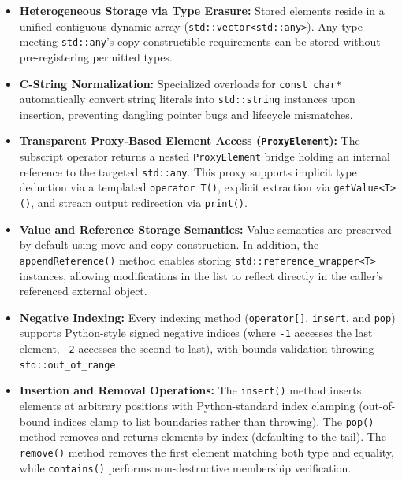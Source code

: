 \documentclass[12pt,a4paper]{report}
\begin{document}
\begin{itemize}
    \item \textbf{Heterogeneous Storage via Type Erasure:} Stored elements reside in a unified contiguous dynamic array (\texttt{std::vector<std::any>}). Any type meeting \texttt{std::any}'s copy-constructible requirements can be stored without pre-registering permitted types.
    
    \item \textbf{C-String Normalization:} Specialized overloads for \texttt{const char*} automatically convert string literals into \texttt{std::string} instances upon insertion, preventing dangling pointer bugs and lifecycle mismatches.
    
    \item \textbf{Transparent Proxy-Based Element Access (\texttt{ProxyElement}):} The subscript operator returns a nested \texttt{ProxyElement} bridge holding an internal reference to the targeted \texttt{std::any}. This proxy supports implicit type deduction via a templated \texttt{operator T()}, explicit extraction via \texttt{getValue<T>()}, and stream output redirection via \texttt{print()}.
    
    \item \textbf{Value and Reference Storage Semantics:} Value semantics are preserved by default using move and copy construction. In addition, the \texttt{appendReference()} method enables storing \texttt{std::reference\_wrapper<T>} instances, allowing modifications in the list to reflect directly in the caller's referenced external object.
    
    \item \textbf{Negative Indexing:} Every indexing method (\texttt{operator[]}, \texttt{insert}, and \texttt{pop}) supports Python-style signed negative indices (where \texttt{-1} accesses the last element, \texttt{-2} accesses the second to last), with bounds validation throwing \texttt{std::out\_of\_range}.
    
    \item \textbf{Insertion and Removal Operations:} The \texttt{insert()} method inserts elements at arbitrary positions with Python-standard index clamping (out-of-bound indices clamp to list boundaries rather than throwing). The \texttt{pop()} method removes and returns elements by index (defaulting to the tail). The \texttt{remove()} method removes the first element matching both type and equality, while \texttt{contains()} performs non-destructive membership verification.
    

\end{itemize}
\end{document}

